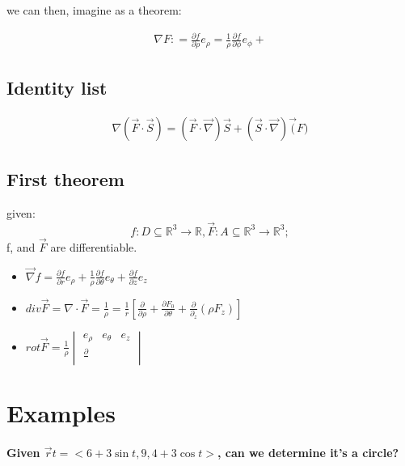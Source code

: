 \documentclass[11pt,fleqn]{book} %
\begin{document}
we can then, imagine as a theorem:

\begin{gather}
    \nabla F : = \frac{\partial f}{\partial \rho} e_\rho = \frac{1}{\rho} \frac{\partial f}{\partial \phi} e_\phi +
\end{gather}

\subsection{Identity list}

\begin{gather}
    \nabla ( \vec{F} \cdot \vec{S} ) = (\vec{F} \cdot \vec{\nabla}) \vec{S} + (\vec{S} \cdot \vec{\nabla}) \vec(F)
\end{gather}

\subsection{First theorem}

given:
\begin{equation}
    f: D \subseteq \mathbb{R}^3 \to \mathbb{R}, \vec{F}: A \subseteq \mathbb{R}^3 \to \mathbb{R}^3;
\end{equation}
f, and $\vec{F}$ are differentiable.

\begin{itemize}
    \item $\vec{\nabla} f = \frac{\partial f}{\partial r} e_\rho + \frac{1}{\rho} \frac{\partial f}{\partial \theta} e_\theta + \frac{\partial f}{\partial z} e_z $
    \item $div \vec{F} = \nabla \cdot \vec{F} = \frac{1}{\rho} = \frac{1}{r}[\frac{\partial}{\partial \rho} + \frac{\partial F_0}{\partial \theta} + \frac{\partial}{\partial_z}(\rho F_z)]$
    \item $rot \vec{F} = \frac{1}{\rho} \begin{vmatrix}
        e_\rho & e_\theta & e_z \\
        \frac{\partial}{}
    \end{vmatrix}$
\end{itemize}

\section{Examples}

\paragraph{Given $\vec{r}t = <6+3\sin t, 9, 4+3\cos t>$, can we determine it's a circle?}
\end{document}
